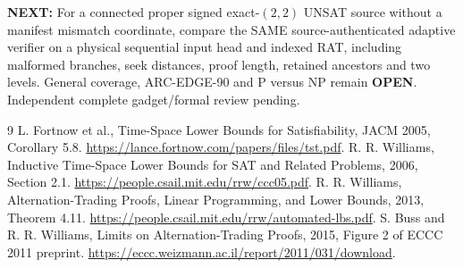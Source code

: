 \documentclass[11pt]{article}
\begin{document}
\textbf{NEXT:} For a connected proper signed exact-$(2,2)$ UNSAT source without a manifest mismatch coordinate, compare the SAME source-authenticated adaptive verifier on a physical sequential input head and indexed RAT, including malformed branches, seek distances, proof length, retained ancestors and two levels. General coverage, ARC-EDGE-90 and P versus NP remain \textbf{OPEN}. Independent complete gadget/formal review pending.
\begin{thebibliography}{9}
 L. Fortnow et al., Time-Space Lower Bounds for Satisfiability, JACM 2005, Corollary 5.8. \url{https://lance.fortnow.com/papers/files/tst.pdf}.
 R. R. Williams, Inductive Time-Space Lower Bounds for SAT and Related Problems, 2006, Section 2.1. \url{https://people.csail.mit.edu/rrw/ccc05.pdf}.
 R. R. Williams, Alternation-Trading Proofs, Linear Programming, and Lower Bounds, 2013, Theorem 4.11. \url{https://people.csail.mit.edu/rrw/automated-lbs.pdf}.
 S. Buss and R. R. Williams, Limits on Alternation-Trading Proofs, 2015, Figure 2 of ECCC 2011 preprint. \url{https://eccc.weizmann.ac.il/report/2011/031/download}.
\end{thebibliography}
\end{document}
